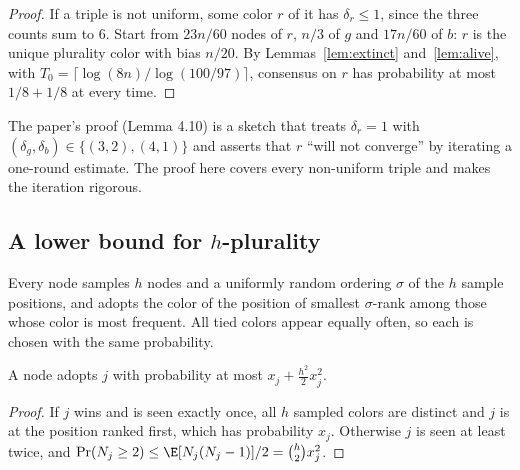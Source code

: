 \begin{proof}
  \leanok
  If a triple is not uniform, some color $r$ of it has $\delta_r \le 1$,
  since the three counts sum to $6$. Start from $23n/60$ nodes of $r$, $n/3$
  of $g$ and $17n/60$ of $b$: $r$ is the unique plurality color with bias
  $n/20$. By Lemmas~\ref{lem:extinct} and~\ref{lem:alive}, with
  $T_0 = \lceil\log(8n)/\log(100/97)\rceil$, consensus on $r$ has probability
  at most $1/8 + 1/8$ at every time.
\end{proof}

\begin{remark}
  The paper's proof (Lemma 4.10) is a sketch that treats $\delta_r = 1$ with
  $(\delta_g,\delta_b) \in \{(3,2),(4,1)\}$ and asserts that $r$ ``will not
  converge'' by iterating a one-round estimate. The proof here covers every
  non-uniform triple and makes the iteration rigorous.
\end{remark}

\subsection{A lower bound for \texorpdfstring{$h$}{h}-plurality}

\begin{definition}[$h$-plurality]\label{def:hplur}
  \leanok
  Every node samples $h$ nodes and a uniformly random ordering $\sigma$ of the
  $h$ sample positions, and adopts the color of the position of smallest
  $\sigma$-rank among those whose color is most frequent. All tied colors
  appear equally often, so each is chosen with the same probability.
\end{definition}

\begin{lemma}\label{lem:hadopt}
  \leanok
  A node adopts $j$ with probability at most $x_j + \frac{h^2}{2}x_j^2$.
\end{lemma}

\begin{proof}
  \leanok
  If $j$ wins and is seen exactly once, all $h$ sampled colors are distinct
  and $j$ is at the position ranked first, which has probability $x_j$.
  Otherwise $j$ is seen at least twice, and
  $\Pr(N_j \ge 2) \le \E[N_j(N_j-1)]/2 = \binom h2 x_j^2$.
\end{proof}

